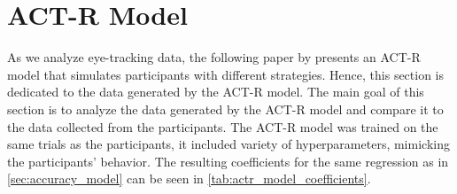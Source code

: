 



\section{ACT-R Model}
\label{sec:actr_model}
As we analyze eye-tracking data, the following paper by  presents an ACT-R model that simulates participants with different strategies. Hence, this section is dedicated to the data generated by the ACT-R model. The main goal of this section is to analyze the data generated by the ACT-R model and compare it to the data collected from the participants. The ACT-R model was trained on the same trials as the participants, it included variety of hyperparameters, mimicking the participants' behavior. The resulting coefficients for the same regression as in \autoref{sec:accuracy_model} can be seen in \autoref{tab:actr_model_coefficients}. 

